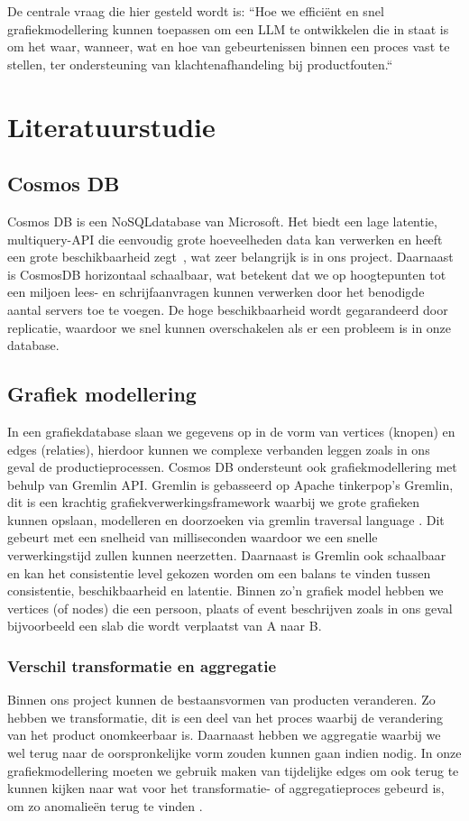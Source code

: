 De centrale vraag die hier gesteld wordt is: ``Hoe we efficiënt en snel grafiekmodellering kunnen toepassen om een LLM te ontwikkelen die in staat is om het waar, wanneer, wat en hoe van gebeurtenissen binnen een proces vast te stellen, ter ondersteuning van klachtenafhandeling bij productfouten.``
\section{Literatuurstudie}%
\label{sec:literatuurstudie}

\subsection{Cosmos DB}%
Cosmos DB is een NoSQL\-database van Microsoft. Het biedt een lage latentie, multi\-query-API die eenvoudig grote hoeveelheden data kan verwerken en heeft een grote beschikbaarheid zegt~\textcite{Put2020}, wat zeer belangrijk is in ons project.
Daarnaast is CosmosDB horizontaal schaalbaar, wat betekent dat we op hoogtepunten tot een miljoen lees- en schrijfaanvragen kunnen verwerken door het benodigde aantal servers toe te voegen.
De hoge beschikbaarheid wordt gegarandeerd door replicatie, waardoor we snel kunnen overschakelen als er een probleem is in onze database.

\subsection{Grafiek modellering}
In een grafiekdatabase slaan we gegevens op in de vorm van vertices (knopen) en edges (relaties), hierdoor kunnen we complexe verbanden leggen zoals in ons geval de productieprocessen.
Cosmos DB ondersteunt ook grafiekmodellering met behulp van Gremlin API. Gremlin is gebasseerd op Apache tinkerpop's Gremlin, dit is een krachtig grafiekverwerkingsframework waarbij we grote grafieken kunnen opslaan, modelleren en doorzoeken via gremlin traversal language \autocite{Microsoft2024}.
Dit gebeurt met een snelheid van milliseconden waardoor we een snelle verwerkingstijd zullen kunnen neerzetten.
Daarnaast is Gremlin ook schaalbaar en kan het consistentie level gekozen worden om een balans te vinden tussen consistentie, beschikbaarheid en latentie.
Binnen zo'n grafiek model hebben we vertices (of nodes) die een persoon, plaats of event beschrijven zoals in ons geval bijvoorbeeld een slab die wordt verplaatst van A naar B.

\subsubsection{Verschil transformatie en aggregatie}
Binnen ons project kunnen de bestaansvormen van producten veranderen. Zo hebben we transformatie, dit is een deel van het proces waarbij de verandering van het product onomkeerbaar is.
Daarnaast hebben we aggregatie waarbij we wel terug naar de oorspronkelijke vorm zouden kunnen gaan indien nodig.
In onze grafiekmodellering moeten we gebruik maken van tijdelijke edges om ook terug te kunnen kijken naar wat voor het transformatie- of aggregatieproces gebeurd is, om zo anomalieën terug te vinden \autocite{JaewookByun2020}.

